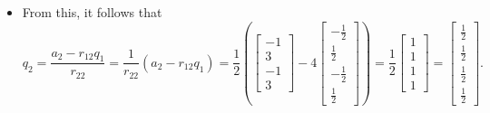 \documentclass[letterpaper]{article}
\begin{document}
\begin{mdframed}
\begin{mdframed}
\begin{itemize}
\begin{equation*}
\begin{aligned}
\begin{bmatrix}
                        \end{bmatrix} \right|\right|_2 = \left|\left| \begin{bmatrix}
                            -1 \\ 3 \\ -1 \\ 3
                        \end{bmatrix} - \begin{bmatrix}
                            -2 \\ 2 \\ -2 \\ 2
                        \end{bmatrix} \right|\right|_2 \\ 
                        &= \left|\left| \begin{bmatrix}
                            1 \\ 1 \\ 1 \\ 1
                        \end{bmatrix} \right|\right|_2 = \sqrt{1^2 + 1^2 + 1^2 + 1^2} = \sqrt{4} = 2.
                \end{aligned}
            \end{equation*}
            \item From this, it follows that 
            \[q_2 = \frac{a_2 - r_{12} q_1}{r_{22}} = \frac{1}{r_{22}}(a_2 - r_{12} q_1) = \frac{1}{2}\left(\begin{bmatrix}
                -1 \\ 3 \\ -1 \\ 3
            \end{bmatrix} - 4 \begin{bmatrix}
                -\frac{1}{2} \\ \frac{1}{2} \\ -\frac{1}{2} \\ \frac{1}{2}
            \end{bmatrix}\right) = \frac{1}{2}\begin{bmatrix}
                1 \\ 1 \\ 1 \\ 1
            \end{bmatrix} = \begin{bmatrix}
                \frac{1}{2} \\ \frac{1}{2} \\ \frac{1}{2} \\ \frac{1}{2}
            \end{bmatrix}.\]
        \end{itemize}
    \end{mdframed}


\end{mdframed}
\end{document}
